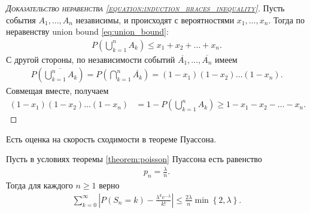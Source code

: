\documentclass[../main.tex]{subfiles}
\begin{document}
\begin{proof}[\normalfont\textsc{Доказательство неравенства \eqref{equation:induction_braces_inequality}}]

 Пусть события $ A_1, \ldots, A_n $  независимы, и происходят с вероятностями $ x_1, \ldots, x_n $. Тогда по неравенству union bound \eqref{eq:union_bound}:
 \begin{align*}
  P \left( \bigcup_{k=1}^{n}A_k \right) \leqslant x_1 + x_2 +  \ldots + x_n.
 \end{align*} С другой стороны, по независимости событий $ \overline{A_1},\ldots,\overline{A_n} $  имеем
 \begin{align*}
  P \left( \overline{ \bigcup_{k=1}^{n}A_k} \right) = P \left( \bigcap_{k=1}^{n} \overline{A_k} \right) = (1-x_1)(1-x_2) \ldots (1-x_n).
 \end{align*} Совмещая вместе, получаем
 \begin{align*}
  (1-x_1)(1-x_2)\ldots(1-x_n) &= 1 - P \left( \bigcup_{k=1}^{n}A_k \right) \geqslant 1 - x_1 -x_2 - \ldots - x_n.
 \end{align*}
\end{proof}

Есть оценка на скорость сходимости в теореме Пуассона.

\begin{thm}[%
 Прохорова]
 Пусть в условиях теоремы \eqref{theorem:poisson} Пуассона есть равенство
 \begin{align*}
  p_n = \frac{\lambda}{n}.
 \end{align*} Тогда для каждого $ n \geqslant 1 $ верно
 \begin{align*}
  \sum_{k=0}^{\infty} \left| P(S_n = k) - \frac{\lambda^{k}e^{-\lambda}}{k!}\right| \leqslant \frac{2\lambda}{n} \min \left\{ 2, \lambda \right\}.
 \end{align*} 
\end{thm}
\end{document}

